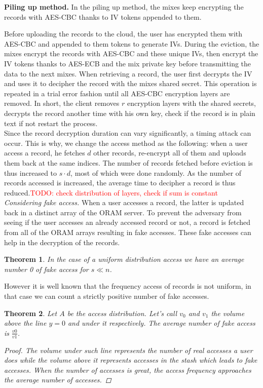 \documentclass[USenglish,oneside,twocolumn]{article}
\newtheorem{theorem}{Theorem}
\newcommand{\todo}[1]{\textcolor{red}{TODO: #1}}
\begin{document}
\textbf{Piling up method.} In the piling up method, the mixes keep encrypting the records with AES-CBC thanks to IV tokens appended to them.

Before uploading the records to the cloud, the user has encrypted them with AES-CBC and appended to them tokens to generate IVs. During the eviction, the mixes encrypt the records with AES-CBC and these unique IVs, then encrypt the IV tokens thanks to AES-ECB and the mix private key before transmitting the data to the next mixes.
When retrieving a record, the user first decrypts the IV and uses it to decipher the record with the mixes shared secret. This operation is repeated in a trial error fashion until all AES-CBC encryption layers are removed. In short, the client removes $r$ encryption layers with the shared secrets, decrypts the record another time with his own key, check if the record is in plain text if not restart the process.\\
Since the record decryption duration can vary significantly, a timing attack can occur. This is why, we change the access method as the following: when a user access a record, he fetches $d$ other records, re-encrypt all of them and uploads them back at the same indices. The number of records fetched before eviction is thus increased to $s\cdot d$, most of which were done randomly. As the number of records accessed is increased, the average time to decipher a record is thus reduced.\todo{check distribution of layers, check if sum is constant} \\

\noindent\textit{Considering fake access.} When a user accesses a record, the latter is updated back in a distinct array of the ORAM server. To prevent the adversary from seeing if the user accesses an already accessed record or not, a record is fetched from all of the ORAM arrays resulting in fake accesses. These fake accesses can help in the decryption of the records. 
%
\begin{theorem}
In the case of a uniform distribution access we have an average number 0 of fake access for $s\ll n$.
\end{theorem}
%
However it is well known that the frequency access of records is not uniform, in that case we can count a strictly positive number of fake accesses.
\begin{theorem}
Let $A$ be the access distribution. Let's call $v_0$ and $v_1$ the volume above the line $y=0$ and under it respectively.
The average number of fake access is $ \frac{v0}{v1}$.
\begin{proof}
The volume under such line represents the number of real accesses a user does while the volume above it represents accesses in the stash which leads to fake accesses.
When the number of accesses is great, the access frequency approaches the average number of accesses.
\end{proof}
\end{theorem}
\end{document}
